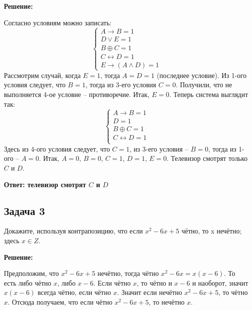 \documentclass[a4paper,14pt]{article} %
\begin{document}
\begin{center}
\bfseries
\newpage
{\Large Решение: }
\end{center}


Согласно условиям можно записать:
 \[\begin{cases}
   A \rightarrow B = 1\\
   D \vee E = 1\\
   B \oplus C = 1\\
   C \leftrightarrow D = 1\\
   E \rightarrow (A \wedge D) = 1
\end{cases}\]
Рассмотрим случай, когда $E = 1$, тогда $A = D = 1$ (последнее условие). Из 1-ого условия следует, что $B = 1$, тогда из 3-его условия $C = 0$. Получили, что не выполняется 4-ое условие -- противоречие. Итак, $E = 0$.
Теперь система выглядит так:
  \[\begin{cases}
   A \rightarrow B = 1\\
   D = 1\\
   B \oplus C = 1\\
   C \leftrightarrow D = 1\\
\end{cases}\]
Здесь из 4-ого условия следует, что $C = 1$, из 3-его условия -- $B = 0$, тогда из 1-ого -- $A = 0$.
Итак, $A = 0$, $B = 0$, $C = 1$, $D = 1$, $E = 0$. Телевизор смотрят только $C$ и $D$.
\begin{flushright}
\begin{large}
\textbf {Ответ: телевизор смотрят $C$ и $D$}
\end{large}
\end{flushright}

\newpage
\begin{center}
\subsection{Задача 3}
\end{center}

 Докажите, используя контрапозицию, что если $x^2 - 6x + 5$ чётно, то x нечётно; здесь $x \in Z$.
\begin{center}
\bfseries
{\Large Решение: }
\end{center}


Предположим, что $x^2 - 6x + 5$ нечётно, тогда чётно $x^2 - 6x = x(x-6)$. То есть либо чётно $x$, либо $x-6$. Если чётно $x$, то чётно и $x-6$ и наоборот, значит $x(x-6)$ всегда чётно, если чётно $x$. Значит если нечётно  $x^2 - 6x + 5$, то чётно $x$. Отсюда получаем, что если чётно $x^2 - 6x + 5$, то нечётно $x$.
\end{document}
